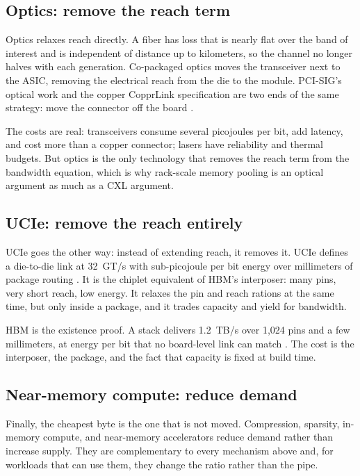 \documentclass[10pt,letterpaper]{article}
\begin{document}
\subsection{Optics: remove the reach term}

Optics relaxes reach directly. A fiber has loss that is nearly flat over the band of interest and is independent of distance up to kilometers, so the channel no longer halves with each generation. Co-packaged optics moves the transceiver next to the ASIC, removing the electrical reach from the die to the module. PCI-SIG's optical work and the copper CopprLink specification are two ends of the same strategy: move the connector off the board \cite{copprlink}.

The costs are real: transceivers consume several picojoules per bit, add latency, and cost more than a copper connector; lasers have reliability and thermal budgets. But optics is the only technology that removes the reach term from the bandwidth equation, which is why rack-scale memory pooling is an optical argument as much as a CXL argument.

\subsection{UCIe: remove the reach entirely}

UCIe goes the other way: instead of extending reach, it removes it. UCIe defines a die-to-die link at 32~GT/s with sub-picojoule per bit energy over millimeters of package routing \cite{ucie}. It is the chiplet equivalent of HBM's interposer: many pins, very short reach, low energy. It relaxes the pin and reach rations at the same time, but only inside a package, and it trades capacity and yield for bandwidth.

HBM is the existence proof. A stack delivers 1.2~TB/s over 1,024 pins and a few millimeters, at energy per bit that no board-level link can match \cite{hbm3e}. The cost is the interposer, the package, and the fact that capacity is fixed at build time.

\subsection{Near-memory compute: reduce demand}

Finally, the cheapest byte is the one that is not moved. Compression, sparsity, in-memory compute, and near-memory accelerators reduce demand rather than increase supply. They are complementary to every mechanism above and, for workloads that can use them, they change the ratio rather than the pipe.
\end{document}
